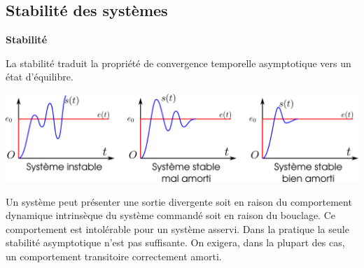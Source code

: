 \documentclass[10pt,fleqn]{article} %
\begin{document}
\subsection{Stabilité des systèmes}
\begin{defi}
 \textbf{Stabilité}

La stabilité traduit la propriété de convergence temporelle asymptotique vers
un état d'équilibre. 
\end{defi}
 \begin{center}
 \includegraphics[width=\textwidth]{images/stabilite}
 \end{center}
Un système peut présenter une sortie divergente soit en
raison du comportement dynamique intrinsèque du système commandé soit en raison
du bouclage. Ce comportement est intolérable pour un système asservi. Dans la
pratique la seule stabilité asymptotique n'est pas suffisante. On exigera, dans
la plupart des cas, un comportement transitoire correctement amorti.


\begin{thebibliography}{2}
\end{thebibliography}
\end{document}
